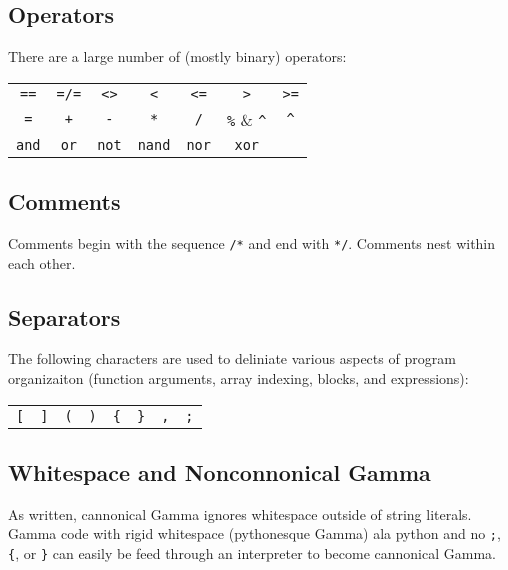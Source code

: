 \subsection{Operators}
There are a large number of (mostly binary) operators:
\begin{center}
\begin{tabular}{ccccccc}
\verb!==! & \verb!=/=! & \verb|<>| & \verb!<! & \verb!<=! & \verb!>! & \verb!>=!\\
\verb!=! & \verb!+! & \verb!-! & \verb!*! & \verb!/! & \verb!%! & \verb!^!\\
\verb!and! & \verb!or! & \verb!not! & \verb!nand! & \verb!nor! & \verb!xor!& \\
\end{tabular}
\end{center}

\subsection{Comments}
Comments begin with the sequence \verb!/*! and end with \verb!*/!. Comments nest within each other.

\subsection{Separators}
The following characters are used to deliniate various aspects of program organizaiton (function arguments, array indexing, blocks, and expressions):
\begin{center}
\begin{tabular}{cccccccc}
\verb![! & \verb|]| & \verb!(! & \verb!)! & \verb!{! & \verb!}! & \verb!,! & \verb!;!\\
\end{tabular}
\end{center}

\subsection{Whitespace and Nonconnonical Gamma}
As written, cannonical Gamma ignores whitespace outside of string literals. Gamma code with rigid whitespace (pythonesque Gamma) ala python and no \verb!;!, \verb!{!, or \verb!}! can easily be feed through an interpreter to become cannonical Gamma.